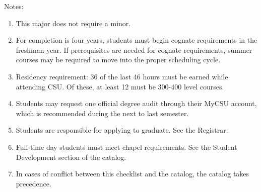 Notes:%
\begin{enumerate}\footnotesize
	\item This major does not require a minor.
	\item For completion is four years, students must begin cognate requirements in the freshman year. If prerequisites are needed for cognate requirements, summer courses may be required to move into the proper scheduling cycle.
	\item Residency requirement: 36 of the last 46 hours must be earned while attending CSU. Of these, at least 12 must be 300-400 level courses.
	\item Students may request one official degree audit through their MyCSU account, which is recommended during the next to last semester.
	\item Students are responsible for applying to graduate. See the Registrar.
	\item Full-time day students must meet chapel requirements. See the Student Development section of the catalog.
	\item In cases of conflict between this checklist and the catalog, the catalog takes precedence.
\end{enumerate}
